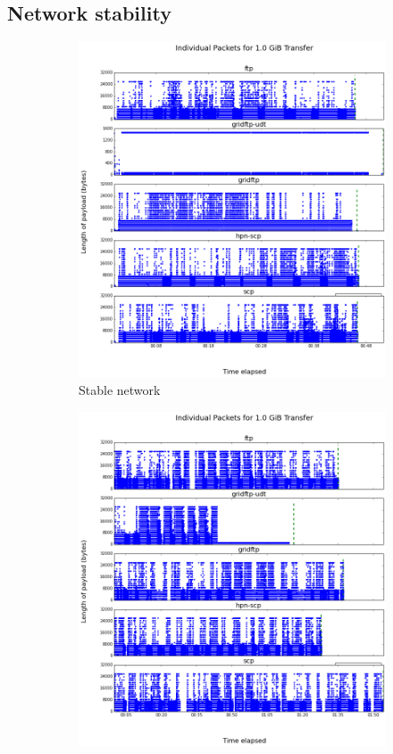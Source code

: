 \documentclass{sig-alternate-05-2015}
\begin{document}
\subsection{Network stability}
\begin{figure}
\centering
	\begin{subfigure}{.4\textwidth}
	\includegraphics[width=\linewidth]{img/packets/good.png}
	\caption{Stable network}
	\label{fig:good_transfer}
	\end{subfigure}
	\begin{subfigure}{.4\textwidth}
	\includegraphics[width=\linewidth]{img/packets/bad.png}

\end{subfigure}
\end{figure}
\end{document}
